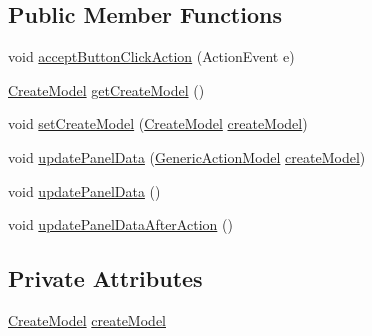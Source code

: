 \subsection*{Public Member Functions}
\begin{DoxyCompactItemize}
\item 
void \hyperlink{classcom_1_1poly_1_1nlp_1_1filekommander_1_1views_1_1panels_1_1_create_action_panel_a641873952ae43e37c7957ff5e5c8fb5f}{accept\-Button\-Click\-Action} (Action\-Event e)
\item 
\hyperlink{classcom_1_1poly_1_1nlp_1_1filekommander_1_1views_1_1models_1_1_create_model}{Create\-Model} \hyperlink{classcom_1_1poly_1_1nlp_1_1filekommander_1_1views_1_1panels_1_1_create_action_panel_ae3bcfdd7de3d71d751e56438567c2597}{get\-Create\-Model} ()
\item 
void \hyperlink{classcom_1_1poly_1_1nlp_1_1filekommander_1_1views_1_1panels_1_1_create_action_panel_a249d557b8a8c1f96611efd035eb9df75}{set\-Create\-Model} (\hyperlink{classcom_1_1poly_1_1nlp_1_1filekommander_1_1views_1_1models_1_1_create_model}{Create\-Model} \hyperlink{classcom_1_1poly_1_1nlp_1_1filekommander_1_1views_1_1panels_1_1_create_action_panel_a7188ccd78e66b6a4fe3dd838fc1ae2f1}{create\-Model})
\item 
void \hyperlink{classcom_1_1poly_1_1nlp_1_1filekommander_1_1views_1_1panels_1_1_create_action_panel_a342522581abfe5d434c868128faad479}{update\-Panel\-Data} (\hyperlink{interfacecom_1_1poly_1_1nlp_1_1filekommander_1_1views_1_1models_1_1_generic_action_model}{Generic\-Action\-Model} \hyperlink{classcom_1_1poly_1_1nlp_1_1filekommander_1_1views_1_1panels_1_1_create_action_panel_a7188ccd78e66b6a4fe3dd838fc1ae2f1}{create\-Model})
\item 
void \hyperlink{classcom_1_1poly_1_1nlp_1_1filekommander_1_1views_1_1panels_1_1_create_action_panel_aa8f5728e0f6a12bb07793fab933e673e}{update\-Panel\-Data} ()
\item 
void \hyperlink{classcom_1_1poly_1_1nlp_1_1filekommander_1_1views_1_1panels_1_1_create_action_panel_a94e3d36d8b58ed6cabfc7f4e62ca7f4d}{update\-Panel\-Data\-After\-Action} ()
\end{DoxyCompactItemize}
\subsection*{Private Attributes}
\begin{DoxyCompactItemize}
\item 
\hyperlink{classcom_1_1poly_1_1nlp_1_1filekommander_1_1views_1_1models_1_1_create_model}{Create\-Model} \hyperlink{classcom_1_1poly_1_1nlp_1_1filekommander_1_1views_1_1panels_1_1_create_action_panel_a7188ccd78e66b6a4fe3dd838fc1ae2f1}{create\-Model}
\end{DoxyCompactItemize}
